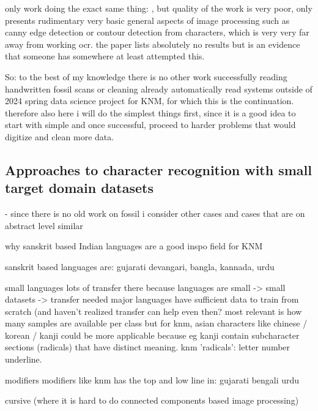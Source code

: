 \documentclass{article}
\begin{document}
only work doing the exact same thing: \cite{shanmugavelHandwrittenOpticalCharacter2018}, but quality of the work is very poor, only 
presents rudimentary very basic general aspects of image processing such as canny edge detection or contour detection from characters, 
which is very very far away from working ocr. the paper lists absolutely no results but is an evidence that someone has somewhere at least 
attempted this.

So: to the best of my knowledge there is no other work successfully reading handwritten fossil scans or cleaning 
already automatically read systems outside of 2024 spring data science project for KNM, for which this is the 
continuation. therefore also here i will do the simplest things first, since it is a good idea to start with simple and 
once successful, proceed to harder problems that would digitize and clean more data.

\subsection{Approaches to character recognition with small target domain datasets}

- since there is no old work on fossil i consider other cases and cases that are on abstract level similar


why sanskrit based Indian languages are a good inspo field for KNM

sanskrit based languages are: gujarati devangari, bangla, kannada, urdu \cite{2limbachiyaGujarati}

small languages
lots of transfer there because languages are small -> small datasets -> transfer needed \cite{2limbachiyaGujarati}
major languages have sufficient data to train from scratch (and haven't realized transfer can help even then? \cite{5rasheedHandwrittenUrduWAlexNet} \cite{4zhaoTibetan}
most relevant is how many samples are available per class
but for knm, asian characters like chinese / korean / kanji could be more applicable because eg kanji contain subcharacter sections (radicals) that have distinct meaning. knm 'radicals': letter number underline. 

modifiers
modifiers like knm has the top and low line in: gujarati \cite{2limbachiyaGujarati} bengali \cite{3chatterjeeBengali} urdu \cite{5rasheedHandwrittenUrduWAlexNet}

cursive \cite{5rasheedHandwrittenUrduWAlexNet}
(where it is hard to do connected components based image processing) 
\end{document}
